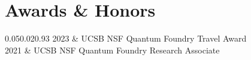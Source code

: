 \section{Awards \& Honors}

\begin{EntriesTable}{0.05}{0.02}{0.93}
2023 & UCSB NSF Quantum Foundry Travel Award \\
2021 & UCSB NSF Quantum Foundry Research Associate \\
\end{EntriesTable}
